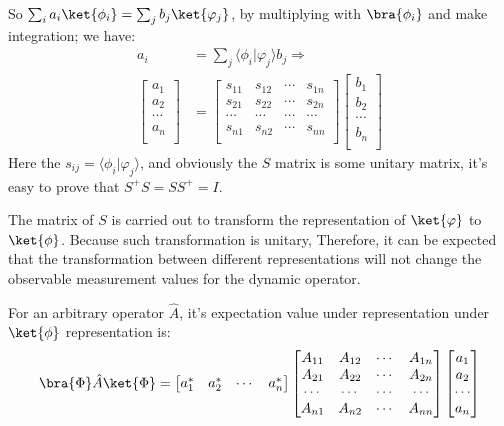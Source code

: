 So $\sum_{i}a_{i}\ket{\phi_{i}} = \sum_{j}b_{j}\ket{\varphi_{j}}$,
by multiplying with $\bra{\phi_{i}}$ and make integration; we have:
\begin{align}\label{REPRESENTATIONeq:12}
a_{i} &= \sum_{j}\langle\phi_{i}|\varphi_{j}\rangle b_{j}
\Rightarrow \nonumber \\
   \begin{bmatrix}
     a_{1} \\
     a_{2} \\
     \cdots \\
     a_{n} \\
   \end{bmatrix} &=
\begin{bmatrix}
     s_{11} & s_{12} & \cdots & s_{1n} \\
     s_{21} & s_{22} & \cdots & s_{2n} \\
     \cdots & \cdots & \cdots & \cdots \\
     s_{n1} & s_{n2} & \cdots & s_{nn} \\
   \end{bmatrix}
      \begin{bmatrix}
     b_{1} \\
     b_{2} \\
     \cdots \\
     b_{n} \\
   \end{bmatrix}
\end{align}
Here the $s_{ij} = \langle\phi_{i}|\varphi_{j}\rangle$, and
obviously the $S$ matrix is some unitary matrix, it's easy to prove
that $S^{+}S = SS^{+} = I$.

The matrix of $S$ is carried out to transform the representation of
$\ket{\varphi}$ to $\ket{\phi}$. Because such transformation is
unitary, Therefore, it can be expected that the transformation
between different representations will not change the observable
measurement values for the dynamic operator.

For an arbitrary operator $\hat{A}$, it's expectation value under
representation under $\ket{\phi}$ representation is:
\begin{equation}\label{REPRESENTATIONeq:13}
\bra{\Phi}\hat{A}\ket{\Phi} =
\begin{bmatrix}
  a_{1}^{*} & a_{2}^{*} & \cdots & a_{n}^{*} \\
\end{bmatrix}
   \begin{bmatrix}
     A_{11} & A_{12} & \cdots & A_{1n} \\
     A_{21} & A_{22} & \cdots & A_{2n} \\
     \cdots & \cdots & \cdots & \cdots \\
     A_{n1} & A_{n2} & \cdots & A_{nn} \\
   \end{bmatrix}
   \begin{bmatrix}
     a_{1} \\
     a_{2} \\
     \cdots \\
     a_{n} \\
   \end{bmatrix}
\end{equation}

